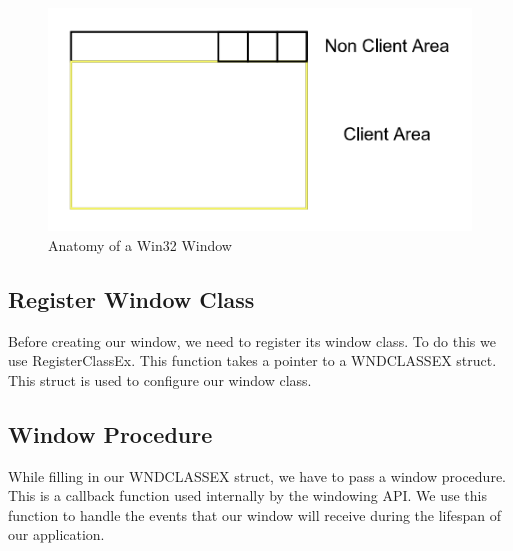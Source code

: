 \begin{figure}[ht]
    \centering
    \includegraphics[scale=0.50]{images/ChInitializingVulkan/Win32Window.png}
    \caption{Anatomy of a Win32 Window}
    \label{fig::Win32Window}
\end{figure}

\begin{minipage}{\linewidth}{\noindent}
    
\end{minipage}

\subsection{Register Window Class}

Before creating our window, we need to register its window class.
To do this we use RegisterClassEx.
This function takes a pointer to a WNDCLASSEX struct.
This struct is used to configure our window class.

\begin{minipage}{\linewidth}{\noindent}
    
\end{minipage}

\subsection{Window Procedure}

While filling in our WNDCLASSEX struct, we have to pass a window procedure.
This is a callback function used internally by the windowing API.
We use this function to handle the events that our window will receive during
the lifespan of our application.

